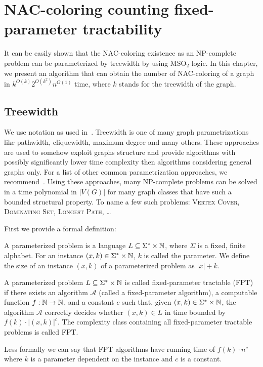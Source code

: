 
\chapter{NAC-coloring counting fixed-parameter tractability}%
\label{chapter:fpt}

\begin{chapterabstract}

	It can be easily shown that the NAC-coloring existence as an NP-complete
	problem can be parameterized by treewidth by using \( \text{MSO}_2 \) logic.
	In this chapter, we present an algorithm that can obtain
	the number of NAC-coloring of a graph in \({k}^{O(k)} 2^{O(k^2)} n^{O(1)}\) time,
	where \(k\) stands for the treewidth of the graph.

\end{chapterabstract}

\section{Treewidth}

We use notation as used in~\cite{book_parametrized_algorithms}.
Treewidth is one of many graph parametrizations like
pathwidth, cliquewidth, maximum degree and many others.
These approaches are used to somehow exploit graphs structure
and provide algorithms with possibly significantly lower time complexity
then algorithms considering general graphs only.
For a list of other common parametrization approaches,
we recommend~\cite{tree_width_comparision_other_classes}.
Using these approaches, many NP-complete problems can be solved
in a time polynomial in \( |V(G)| \)
for many graph classes that have such a bounded structural property.
To name a few such problems:
\textsc{Vertex Cover}, \textsc{Dominating Set}, \textsc{Longest Path}, \dots

First we provide a formal definition:
%
\begin{definition}
	A parameterized problem is a language \( L \subseteq \Sigma^* \times \mathbb{N} \), where
	\( \Sigma \) is a fixed, finite alphabet. For an instance \( (x, k) \in \Sigma^* \times \mathbb{N} \), \( k \) is called the
	parameter.
	We define the size of an instance \( (x, k) \) of a parameterized problem as \( |x| + k \).
\end{definition}
%
\begin{definition}
	A parameterized problem \( L \subseteq \Sigma^* \times \mathbb{N} \) is called fixed-parameter
	tractable (FPT) if there exists an algorithm \( \mathcal{A} \) (called a fixed-parameter
	algorithm), a computable function \( f: \mathbb{N} \to \mathbb{N} \), and a constant
	\( c \) such that, given \( (x, k) \in \Sigma^* \times \mathbb{N} \), the algorithm \( \mathcal{A} \)
	correctly decides
	whether \( (x, k) \in L \) in time bounded by \( f(k) \cdot |(x, k)|^c \). The complexity
	class containing all fixed-parameter tractable problems is called FPT.
\end{definition}
%
Less formally we can say that FPT algorithms
have running time of \( f(k)\cdot n^c \)
where \( k \) is a parameter dependent on the instance
and \( c \) is a constant.


